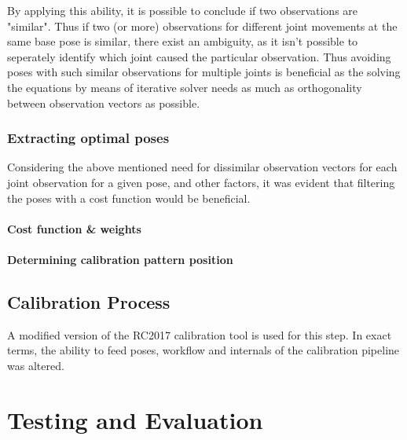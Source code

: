 \documentclass[english, printversion, nomenclature]{tuvisionthesis} %
\begin{document}
By applying this ability, it is possible to conclude if two observations are "similar". Thus if two (or more) observations for different joint movements at the same base pose is similar, there exist an ambiguity, as it isn't possible to seperately identify which joint caused the particular observation. Thus avoiding poses with such similar observations for multiple joints is beneficial as the solving the equations by means of iterative solver needs as much as orthogonality between observation vectors as possible.

\subsection{Extracting optimal poses}

Considering the above mentioned need for dissimilar observation vectors for each joint observation for a given pose, and other factors, it was evident that filtering the poses with a cost function would be beneficial.

\subsubsection{Cost function \& weights}


\subsubsection{Determining calibration pattern position}

\section{Calibration Process}
A modified version of the RC2017 calibration tool is used for this step. In exact terms, the ability to feed poses, workflow and internals of the calibration pipeline was altered.


\chapter{Testing and Evaluation}
\end{document}

